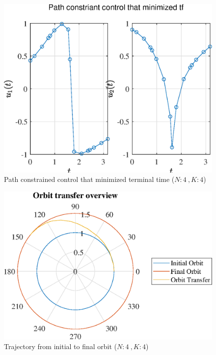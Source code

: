 \documentclass[]{article}
\begin{document}
	\begin{figure}
		\centering
		\includegraphics[scale=0.75]{path_N4_K4_C3_tf.eps}
		\caption{Path constrained control that minimized terminal time (\(N:4\ , K:4\))}
		\label{fig:path_N4_K4_C3_tf}
	\end{figure}
	\begin{figure}
		\centering
		\includegraphics[scale=0.75]{orbit_N4_K4_C3_tf.eps}
		\caption{Trajectory from initial to final orbit (\(N:4\ , K:4\))}
		\label{fig:orbit_N4_K4_C3_tf}
	\end{figure}
\end{document}
